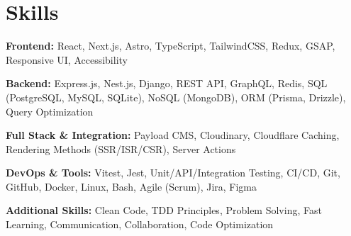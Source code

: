\section{Skills}

    \begin{onecolentry}
        \textbf{Frontend:} React, Next.js, Astro, TypeScript, TailwindCSS, Redux, GSAP, Responsive UI, Accessibility
    \end{onecolentry}

    \begin{onecolentry}
        \textbf{Backend:} Express.js, Nest.js, Django, REST API, GraphQL, Redis, SQL (PostgreSQL, MySQL, SQLite), NoSQL (MongoDB), ORM (Prisma, Drizzle), Query Optimization
    \end{onecolentry}

    \begin{onecolentry}
        \textbf{Full Stack \& Integration:} Payload CMS, Cloudinary, Cloudflare Caching, Rendering Methods (SSR/ISR/CSR), Server Actions
    \end{onecolentry}

    \begin{onecolentry}
        \textbf{DevOps \& Tools:} Vitest, Jest, Unit/API/Integration Testing, CI/CD, Git, GitHub, Docker, Linux, Bash, Agile (Scrum), Jira, Figma
    \end{onecolentry}

    \begin{onecolentry}
        \textbf{Additional Skills:} Clean Code, TDD Principles, Problem Solving, Fast Learning, Communication, Collaboration, Code Optimization
    \end{onecolentry}

